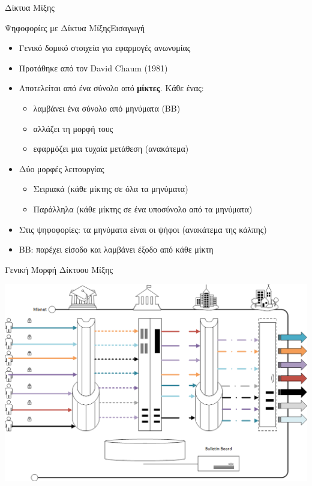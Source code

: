 \documentclass[handout]{beamer}
\begin{document}
\begin{section}{Δίκτυα Μίξης}
\begin{frame}{Ψηφοφορίες με Δίκτυα Μίξης}{Εισαγωγή}
\begin{itemize}
    \item Γενικό δομικό στοιχεία για εφαρμογές ανωνυμίας \pause 
    \item Προτάθηκε από τον David Chaum (1981) \pause 
    \item Αποτελείται από ένα σύνολο από \textbf{μίκτες}. Κάθε ένας:
    \begin{itemize} \pause 
        \item λαμβάνει ένα σύνολο από μηνύματα (ΒΒ)
        \item αλλάζει τη μορφή τους
        \item εφαρμόζει μια τυχαία μετάθεση (ανακάτεμα)
    \end{itemize}
    \item Δύο μορφές λειτουργίας \pause 
    \begin{itemize}
        \item Σειριακά (κάθε μίκτης σε όλα τα μηνύματα)
        \item Παράλληλα (κάθε μίκτης σε ένα υποσύνολο από τα μηνύματα)
    \end{itemize} \pause 
    \item Στις ψηφοφορίες: τα μηνύματα είναι οι ψήφοι (ανακάτεμα της κάλπης)
    \item BB: παρέχει είσοδο και λαμβάνει έξοδο από κάθε μίκτη
\end{itemize}
\end{frame}

\begin{frame}{Γενική Μορφή Δίκτυου Μίξης}
    \begin{center}
        \includegraphics[scale=0.35]{mix.PNG}
    \end{center}
\end{frame}


\end{section}
\end{document}
